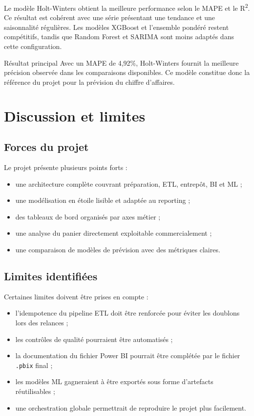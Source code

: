 \documentclass[12pt,a4paper,twoside]{report}
\begin{document}
Le modèle Holt-Winters obtient la meilleure performance selon le MAPE et le R\textsuperscript{2}. Ce résultat est cohérent avec une série présentant une tendance et une saisonnalité régulières. Les modèles XGBoost et l'ensemble pondéré restent compétitifs, tandis que Random Forest et SARIMA sont moins adaptés dans cette configuration.

\begin{resultbox}{Résultat principal}
Avec un MAPE de 4,92\%, Holt-Winters fournit la meilleure précision observée dans les comparaisons disponibles. Ce modèle constitue donc la référence du projet pour la prévision du chiffre d'affaires.
\end{resultbox}

\chapter{Discussion et limites}

\section{Forces du projet}

Le projet présente plusieurs points forts :

\begin{itemize}
  \item une architecture complète couvrant préparation, ETL, entrepôt, BI et ML ;
  \item une modélisation en étoile lisible et adaptée au reporting ;
  \item des tableaux de bord organisés par axes métier ;
  \item une analyse du panier directement exploitable commercialement ;
  \item une comparaison de modèles de prévision avec des métriques claires.
\end{itemize}

\section{Limites identifiées}

Certaines limites doivent être prises en compte :

\begin{itemize}
  \item l'idempotence du pipeline ETL doit être renforcée pour éviter les doublons lors des relances ;
  \item les contrôles de qualité pourraient être automatisés ;
  \item la documentation du fichier Power BI pourrait être complétée par le fichier \texttt{.pbix} final ;
  \item les modèles ML gagneraient à être exportés sous forme d'artefacts réutilisables ;
  \item une orchestration globale permettrait de reproduire le projet plus facilement.
\end{itemize}
\end{document}
